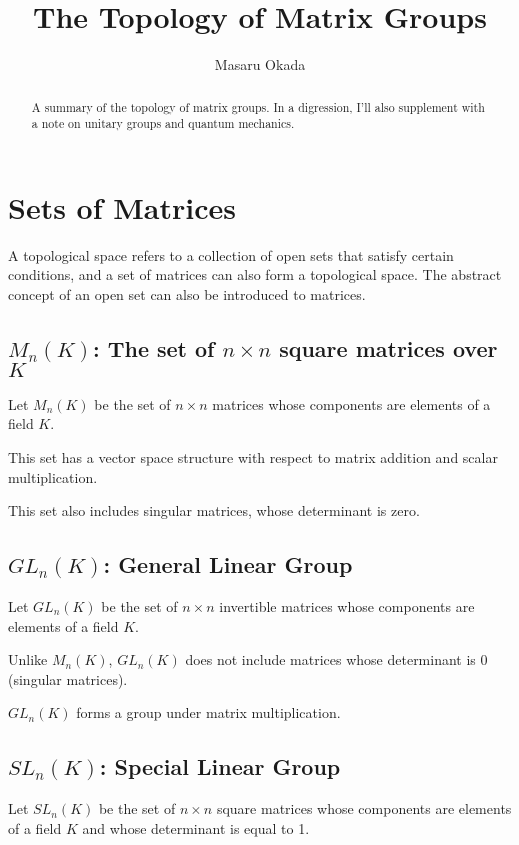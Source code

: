\documentclass[uplatex,a4j,12pt,dvipdfmx]{jsarticle}
\title{
\textbf{The Topology of Matrix Groups}
}
\author{
Masaru Okada
}
\begin{document}
\maketitle


\begin{abstract}
	A summary of the topology of matrix groups. In a digression, I'll also supplement with a note on unitary groups and quantum mechanics.
\end{abstract}

\section{Sets of Matrices}

A topological space refers to a collection of open sets that satisfy certain conditions, and a set of matrices can also form a topological space.
The abstract concept of an open set can also be introduced to matrices.

\subsection{\textbf{$M_{n}(K)$: The set of $n \times n$ square matrices over $K$}}

Let $M_{n}(K)$ be the set of $n \times n$ matrices whose components are elements of a field $K$.

This set has a vector space structure with respect to matrix addition and scalar multiplication.

This set also includes singular matrices, whose determinant is zero.

\subsection{\textbf{$GL_{n}(K)$: General Linear Group}}

Let $GL_{n}(K)$ be the set of $n \times n$ invertible matrices whose components are elements of a field $K$.

Unlike $M_{n}(K)$, $GL_{n}(K)$ does not include matrices whose determinant is 0 (singular matrices).

$GL_{n}(K)$ forms a group under matrix multiplication.

\subsection{\textbf{$SL_{n}(K)$: Special Linear Group}}

Let $SL_{n}(K)$ be the set of $n \times n$ square matrices whose components are elements of a field $K$ and whose determinant is equal to 1.
\end{document}
